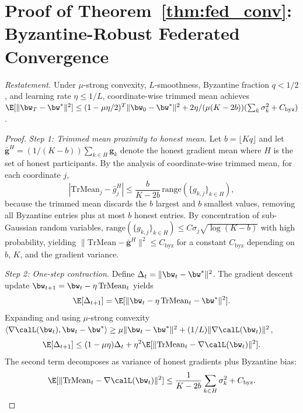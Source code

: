 \section{Proof of Theorem~\ref{thm:fed_conv}: Byzantine-Robust Federated Convergence}
\label{app:proof_fed}

\noindent\textit{Restatement.} Under $\mu$-strong convexity, $L$-smoothness, Byzantine fraction $q<1/2$, and learning rate $\eta\le 1/L$, coordinate-wise trimmed mean achieves $\E[\|\bw_T-\bw^*\|^2]\le(1-\mu\eta/2)^T\|\bw_0-\bw^*\|^2 + 2\eta/(\mu(K-2b))(\sum_k\sigma_k^2 + C_{\mathrm{byz}})$.

\begin{proof}
\textit{Step 1: Trimmed mean proximity to honest mean.} Let $b=\lfloor Kq\rfloor$ and let $\bar{\mathbf{g}}^H = (1/(K-b))\sum_{k\in H}\mathbf{g}_k$ denote the honest gradient mean where $H$ is the set of honest participants. By the analysis of coordinate-wise trimmed mean, for each coordinate $j$,
\begin{equation}
|\mathrm{TrMean}_j - \bar{g}_j^H|
\le \frac{b}{K-2b}\,\mathrm{range}(\{g_{k,j}\}_{k\in H}),
\end{equation}
because the trimmed mean discards the $b$ largest and $b$ smallest values, removing all Byzantine entries plus at most $b$ honest entries. By concentration of sub-Gaussian random variables, $\mathrm{range}(\{g_{k,j}\}_{k\in H})\le C\sigma_j\sqrt{\log(K-b)}$ with high probability, yielding $\|\mathrm{TrMean}-\bar{\mathbf{g}}^H\|^2\le C_{\mathrm{byz}}$ for a constant $C_{\mathrm{byz}}$ depending on $b$, $K$, and the gradient variance.

\textit{Step 2: One-step contraction.} Define $\Delta_t = \|\bw_t-\bw^*\|^2$. The gradient descent update $\bw_{t+1}=\bw_t-\eta\,\mathrm{TrMean}_t$ yields
\begin{equation}
\E[\Delta_{t+1}]
= \E[\|\bw_t - \eta\,\mathrm{TrMean}_t - \bw^*\|^2].
\end{equation}
Expanding and using $\mu$-strong convexity $\langle\nabla\calL(\bw_t),\bw_t-\bw^*\rangle\ge\mu\|\bw_t-\bw^*\|^2 + (1/L)\|\nabla\calL(\bw_t)\|^2$,
\begin{equation}
\E[\Delta_{t+1}]
\le (1-\mu\eta)\Delta_t + \eta^2\E[\|\mathrm{TrMean}_t - \nabla\calL(\bw_t)\|^2].
\end{equation}
The second term decomposes as variance of honest gradients plus Byzantine bias:
\begin{equation}
\E[\|\mathrm{TrMean}_t - \nabla\calL(\bw_t)\|^2]
\le \frac{1}{K-2b}\sum_{k\in H}\sigma_k^2 + C_{\mathrm{byz}}.
\end{equation}


\end{proof}
